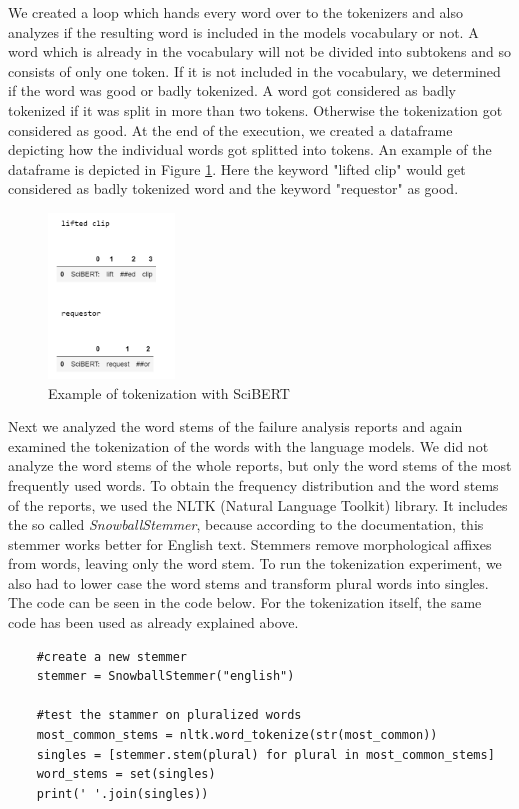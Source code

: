 We created a loop which hands every word over to the tokenizers and also analyzes if the resulting word is included in the models vocabulary or not. A word which is already in the vocabulary will not be divided into subtokens and so consists of only one token. If it is not included in the vocabulary, we determined if the word was good or badly tokenized. A word got considered as badly tokenized if it was split in more than two tokens. Otherwise the tokenization got considered as good. At the end of the execution, we created a dataframe depicting how the individual words got splitted into tokens. An example of the dataframe is depicted in Figure \ref{fig:goodAndBad}. Here the keyword "lifted clip" would get considered as badly tokenized word and the keyword "requestor" as good.

\begin{figure}[H]
	\centering
	\includegraphics[width=0.3\textwidth]{figures/example_good_bad.PNG}
	\caption{Example of tokenization with SciBERT}
	\label{fig:goodAndBad}
\end{figure}


Next we analyzed the word stems of the failure analysis reports and again examined the tokenization of the words with the language models. We did not analyze the word stems of the whole reports, but only the word stems of the most frequently used words. To obtain the frequency distribution and the word stems of the reports, we used the NLTK (Natural Language Toolkit) library. It includes the so called \textit{SnowballStemmer}, because according to the documentation, this stemmer works better for English text. Stemmers remove morphological affixes from words, leaving only the word stem. To run the tokenization experiment, we also had to lower case the word stems and transform plural words into singles. The code can be seen in the code below. For the tokenization itself, the same code has been used as already explained above.

\begin{verbatim}
	#create a new stemmer
	stemmer = SnowballStemmer("english")
	
	#test the stammer on pluralized words
	most_common_stems = nltk.word_tokenize(str(most_common))
	singles = [stemmer.stem(plural) for plural in most_common_stems]
	word_stems = set(singles)
	print(' '.join(singles))
\end{verbatim}

